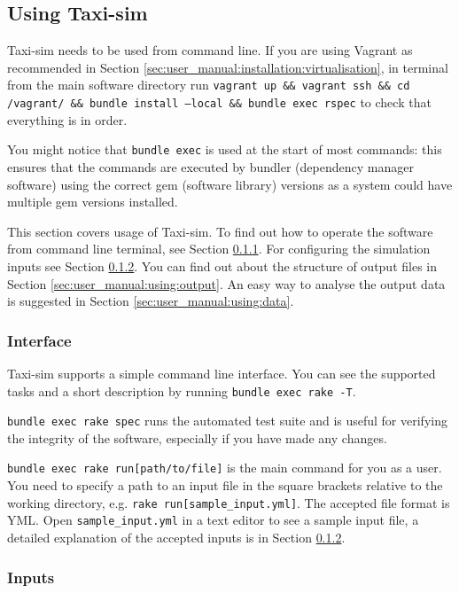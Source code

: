 \subsection{Using Taxi-sim}
\label{sec:user_manual:using}

Taxi-sim needs to be used from command line. If you are using Vagrant as
recommended in Section \ref{sec:user_manual:installation:virtualisation}, in
terminal from the main software directory run \texttt{vagrant up \&\& vagrant
ssh \&\& cd /vagrant/ \&\& bundle install --local \&\& bundle exec rspec} to
check that everything is in order.

You might notice that \texttt{bundle exec} is used at the start of most
commands: this ensures that the commands are executed by bundler (dependency
manager software) using the correct gem (software library) versions as a system
could have multiple gem versions installed.

This section covers usage of Taxi-sim. To find out how to operate the software
from command line terminal, see Section \ref{sec:user_manual:using:interface}.
For configuring the simulation inputs see Section
\ref{sec:user_manual:using:inputs}. You can find out about the structure of
output files in Section \ref{sec:user_manual:using:output}. An easy way to
analyse the output data is suggested in Section
\ref{sec:user_manual:using:data}.

\subsubsection{Interface}
\label{sec:user_manual:using:interface}

Taxi-sim supports a simple command line interface. You can see the supported
tasks and a short description by running \texttt{bundle exec rake -T}.

\texttt{bundle exec rake spec} runs the automated test suite and is useful for
verifying the integrity of the software, especially if you have made any
changes.

\texttt{bundle exec rake run[path/to/file]} is the main command for you as a
user. You need to specify a path to an input file in the square brackets
relative to the working directory, e.g. \texttt{rake run[sample\_input.yml]}.
The accepted file format is YML. Open \texttt{sample\_input.yml} in a text
editor to see a sample input file, a detailed explanation of the accepted
inputs is in Section \ref{sec:user_manual:using:inputs}.


\subsubsection{Inputs}
\label{sec:user_manual:using:inputs}

